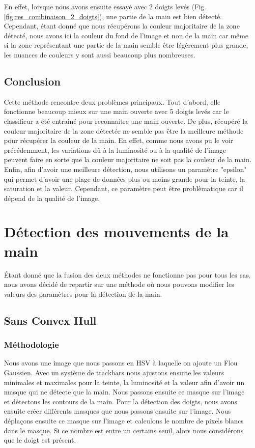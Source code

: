 \documentclass[11pt]{article}
\begin{document}
En effet, lorsque nous avons ensuite essayé avec 2 doigts levés (Fig. \ref{fig:res_combinaison_2_doigts}), une partie de la main est bien détecté. Cependant, étant donné que nous récupérons la couleur majoritaire de la zone détecté, nous avons ici la couleur du fond de l'image et non de la main car même si la zone représentant une partie de la main semble être légèrement plus grande, les nuances de couleurs y sont aussi beaucoup plus nombreuses. 

\subsection{Conclusion}
Cette méthode rencontre deux problèmes principaux. Tout d'abord, elle fonctionne beaucoup mieux sur une main ouverte avec 5 doigts levés car le classifieur a été entrainé pour reconnaitre une main ouverte. 
De plus, récupéré la couleur majoritaire de la zone détectée ne semble pas être la meilleure méthode pour récupérer la couleur de la main. En effet, comme nous avons pu le voir précédemment, les variations dû à la luminosité ou à la qualité de l'image peuvent faire en sorte que la couleur majoritaire ne soit pas la couleur de la main. Enfin, afin d'avoir une meilleure détection, nous utilisons un paramètre "epsilon" qui permet d'avoir une plage de données plus ou moins grande pour la teinte, la saturation et la valeur. Cependant, ce paramètre peut être problèmatique car il dépend de la qualité de l'image. \bigbreak

\bigbreak


\newpage

\section{Détection des mouvements de la main}
\'Etant donné que la fusion des deux méthodes ne fonctionne pas pour tous les cas, nous avons décidé de repartir sur une méthode où nous pouvons modifier les valeurs des paramètres pour la détection de la main.

\subsection{Sans Convex Hull}

\subsubsection{Méthodologie}
Nous avons une image que nous passons en HSV à laquelle on ajoute un Flou Gaussien. Avec un système de trackbars nous ajustons ensuite les valeurs minimales et maximales pour la teinte, la luminosité et la valeur afin d'avoir un masque qui ne détecte que la main. Nous passons ensuite ce masque sur l'image et détectons les contours de la main. Pour la détection des doigts, nous avons ensuite créer différents masques que nous passons ensuite sur l'image. Nous déplaçons ensuite ce masque sur l'image et calculons le nombre de pixels blancs dans le masque. Si ce nombre est entre un certains seuil, alors nous considérons que le doigt est présent. \bigbreak
\end{document}
